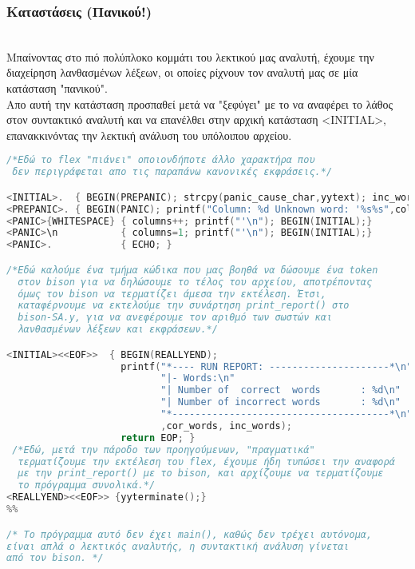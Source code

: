 \documentclass[14pt]{extarticle}
\begin{document}
\subsubsection{Καταστάσεις (Πανικού!)}
\\
Μπαίνοντας στο πιό πολύπλοκο κομμάτι του λεκτικού μας αναλυτή, έχουμε την
διαχείρηση λανθασμένων λέξεων, οι οποίες ρίχνουν τον αναλυτή μας σε μία κατάσταση
"πανικού".
\\
Απο αυτή την κατάσταση προσπαθεί μετά να "ξεφύγει" με το να αναφέρει το λάθος στον συντακτικό
αναλυτή και να επανέλθει στην αρχική κατάσταση <INITIAL>, επανακκινόντας την λεκτική ανάλυση του
υπόλοιπου αρχείου.
\begin{lstlisting}[language=C]
/*Εδώ το flex "πιάνει" οποιονδήποτε άλλο χαρακτήρα που 
 δεν περιγράφεται απο τις παραπάνω κανονικές εκφράσεις.*/

<INITIAL>.  { BEGIN(PREPANIC); strcpy(panic_cause_char,yytext); inc_words++; return UNKNOWN;}
<PREPANIC>. { BEGIN(PANIC); printf("Column: %d Unknown word: '%s%s",columns,panic_cause_char,yytext);}
<PANIC>{WHITESPACE} { columns++; printf("'\n"); BEGIN(INITIAL);}
<PANIC>\n           { columns=1; printf("'\n"); BEGIN(INITIAL);}
<PANIC>.            { ECHO; }

/*Εδώ καλούμε ένα τμήμα κώδικα που μας βοηθά να δώσουμε ένα token
  στον bison για να δηλώσουμε το τέλος του αρχείου, αποτρέποντας
  όμως τον bison να τερματίζει άμεσα την εκτέλεση. Έτσι,
  καταφέρνουμε να εκτελούμε την συνάρτηση print_report() στο
  bison-SA.y, για να ανεφέρουμε τον αριθμό των σωστών και
  λανθασμένων λέξεων και εκφράσεων.*/

<INITIAL><<EOF>>  { BEGIN(REALLYEND);
                    printf("*---- RUN REPORT: ---------------------*\n"
                           "|- Words:\n"
                           "| Number of  correct  words       : %d\n"
                           "| Number of incorrect words       : %d\n"
                           "*--------------------------------------*\n"
                           ,cor_words, inc_words);
                    return EOP; }
 /*Εδώ, μετά την πάροδο των προηγούμενων, "πραγματικά"
  τερματίζουμε την εκτέλεση του flex, έχουμε ήδη τυπώσει την αναφορά
  με την print_report() με το bison, και αρχίζουμε να τερματίζουμε
  το πρόγραμμα συνολικά.*/
<REALLYEND><<EOF>> {yyterminate();}
%%

/* Το πρόγραμμα αυτό δεν έχει main(), καθώς δεν τρέχει αυτόνομα,
είναι απλά ο λεκτικός αναλυτής, η συντακτική ανάλυση γίνεται
από τον bison. */

\end{lstlisting}
\end{document}
